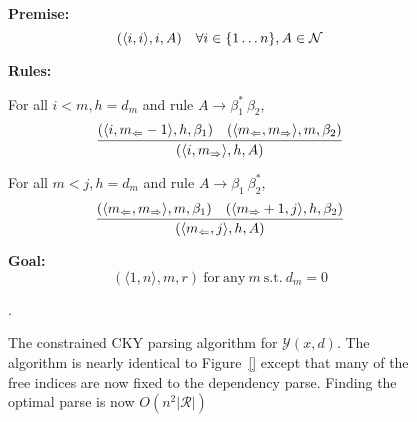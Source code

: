 \documentclass[11pt,letterpaper]{article}
\newcommand{\nonterms}{\mathcal{N}}
\newcommand{\rules}{\mathcal{R}}
\newcommand{\Left}[1]{#1_{\Leftarrow}}
\newcommand{\Right}[1]{#1_{\Rightarrow}}
\newcommand{\Span}[1]{\langle #1 \rangle}
\newcommand{\Root}{r}
\newcommand{\RuleA}[3]{#1 \rightarrow #2^*\ #3}
\newcommand{\RuleB}[3]{#1 \rightarrow #2\ #3^*}
\newcommand{\tri}{\Span{\Left{m}, \Right{m}}}
\begin{document}






\begin{figure}
  \noindent \textbf{Premise:}
  \[(\langle i,i \rangle, i, A)\ \ \ \forall i \in \{1 \ldots n\}, A \in {\cal N}\]

  \noindent\textbf{Rules:}



   For all   $i < m, h = d_m$  and rule  $\RuleA{A}{\beta_1}{\beta_2}$,
  \[\infer{( \Span{ i, \Right{m} }, h, A)}{(\Span{i, \Left{m}-1}, h, \beta_1)  &  (\tri, m, \beta_2) } \]

  For all    $m < j, h = d_m$ and  rule  $\RuleB{A}{\beta_1}{\beta_2}$,
  \[ \infer{( \Span{\Left{m}, j}, h, A)}{(\tri, m, \beta_1)  &  (\Span{\Right{m}+ 1, j}, h, \beta_2) } \]



\noindent \textbf{Goal:}\[ (\Span{1, n}, m, \Root) \mathrm{\ for\ any }\ m \mathrm{\ s.t. \ } d_m = 0  \]
\label{fig:cky_new}
\caption{The constrained CKY parsing algorithm for $\mathcal{Y}(x, d)$. The algorithm is nearly identical to Figure~\ref{} except that many of the free indices are now fixed to the dependency parse. Finding the optimal parse is now $O(n^2|\rules|)$}.
\end{figure}
\end{document}
